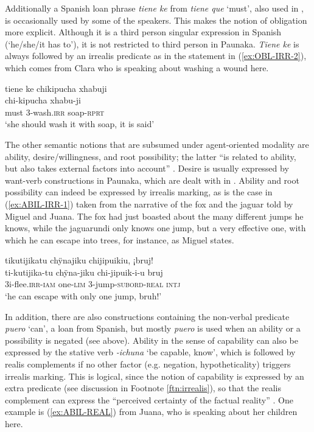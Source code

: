 Additionally a Spanish loan phrase \textit{tiene ke} from \textit{tiene que} ‘must’, also used in , is occasionally used by some of the speakers. This makes the notion of obligation more explicit. Although it is a third person singular expression in Spanish (‘he/she/it has to’), it is not restricted to third person in Paunaka. \textit{Tiene ke} is always followed by an irrealis predicate as in the statement in (\ref{ex:OBL-IRR-2}), which comes from Clara who is speaking about washing a wound here.

\ea\label{ex:OBL-IRR-2}
\begingl 
\glpreamble tiene ke chikipucha xhabuji\\
 chi-kipucha xhabu-ji\\ 
\glb must 3-wash.\textsc{irr} soap-\textsc{rprt}\\ 
\glft ‘she should wash it with soap, it is said’\\ 
\endgl
 \trailingcitation{[cux-120410ls.244]}
\xe


The other semantic notions that are subsumed under agent-oriented modality are ability, desire/willingness, and root possibility; the latter “is related to ability, but also takes external factors into account” \citep[31]{deHaan2005}. Desire is usually expressed by want-verb constructions in Paunaka, which are dealt with in . Ability and root possibility can indeed be expressed by irrealis marking, as is the case in (\ref{ex:ABIL-IRR-1}) taken from the narrative of the fox and the jaguar told by Miguel and Juana. The fox had just boasted about the many different jumps he knows, while the jaguarundi only knows one jump, but a very effective one, with which he can escape into trees, for instance, as Miguel states.

\ea\label{ex:ABIL-IRR-1}
\begingl
\glpreamble tikutijikatu chÿnajiku chijipuikiu, ¡bruj!\\
\gla ti-kutijika-tu chÿna-jiku chi-jipuik-i-u bruj\\
\glb 3i-flee.\textsc{irr}-\textsc{iam} one-\textsc{lim} 3-jump-\textsc{subord}-\textsc{real} \textsc{intj}\\
\glft ‘he can escape with only one jump, bruh!’
\endgl
 \trailingcitation{[jmx-n120429ls-x5.365]}
\xe
{}

In addition, there are also constructions containing the non-verbal predicate \textit{puero} ‘can’, a loan from Spanish, but mostly \textit{puero} is used when an ability or a possibility is negated (see  above). Ability in the sense of capability can also be expressed by the stative verb \textit{-ichuna} ‘be capable, know’, which is followed by realis complements if no other factor (e.g. negation, hypotheticality) triggers irrealis marking. This is logical, since the notion of capability is expressed by an extra predicate (see discussion in Footnote \ref{ftn:irrealis}), so that the realis complement can express the “perceived certainty of the factual reality” \citep[67]{Elliott2000}. One example is (\ref{ex:ABIL-REAL}) from Juana, who is speaking about her children here.

